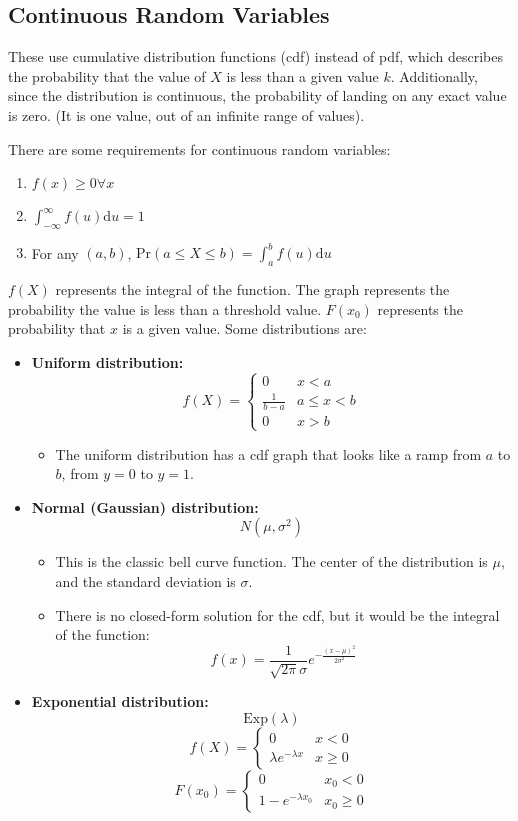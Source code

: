\documentclass[10pt]{article}
\newcommand{\dd}{\text{d}}
\newcommand{\pr}{\text{Pr}}
\begin{document}
\subsection*{Continuous Random Variables}
These use cumulative distribution functions (cdf) instead of pdf, which describes the probability that the value of $X$ is less than a given value $k$.  Additionally, since the distribution is continuous, the probability of landing on any exact value is zero.  (It is one value, out of an infinite range of values).

There are some requirements for continuous random variables:
\begin{enumerate}
	\item $f(x) \geq 0 \forall x$
	\item $\int_{-\infty}^{\infty} f(u) \dd u = 1$
	\item For any $(a, b)$, $\pr(a \leq X \leq b) = \int_a^b f(u) \dd u$
\end{enumerate}

$f(X)$ represents the integral of the function.  The graph represents the probability the value is less than a threshold value.
$F(x_0)$ represents the probability that $x$ is a given value.
Some distributions are:
\begin{itemize}
	\item \textbf{Uniform distribution:}
	\[f(X) = \begin{cases} 0 & x < a \\ \frac{1}{b - a} & a \leq x < b \\ 0 & x > b \end{cases}\]
    \begin{itemize}
	    \item The uniform distribution has a cdf graph that looks like a ramp from $a$ to $b$, from $y = 0$ to $y = 1$.
    \end{itemize}
    \item \textbf{Normal (Gaussian) distribution:}
    \[N(\mu, \sigma^2)\]
    \begin{itemize}
	    \item This is the classic bell curve function.  The center of the distribution is $\mu$, and the standard deviation is $\sigma$.
	    \item There is no closed-form solution for the cdf, but it would be the integral of the function:
	    \[f(x) = \frac{1}{\sqrt{2\pi} \sigma} e^{-\frac{(x - \mu)^2}{2 \sigma^2}}\]
    \end{itemize}
    \item \textbf{Exponential distribution:}
	    \[\text{Exp}(\lambda)\]
        \[f(X) = \begin{cases} 0 & x < 0 \\ \lambda e^{-\lambda x} & x \geq 0 \end{cases}\]
        \[F(x_0) = \begin{cases} 0 & x_0 < 0 \\ 1 - e^{-\lambda x_0} & x_0 \geq 0 \end{cases}\]
\end{itemize}
\end{document}
